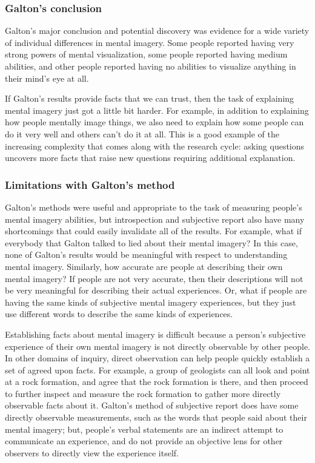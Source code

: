 \documentclass[
  oneside,
  12pt]{crumpbook}
\begin{document}
\hypertarget{galtons-conclusion}{%
\subsubsection{Galton's conclusion}\label{galtons-conclusion}}

Galton's major conclusion and potential discovery was evidence for a wide variety of individual differences in mental imagery. Some people reported having very strong powers of mental visualization, some people reported having medium abilities, and other people reported having no abilities to visualize anything in their mind's eye at all.

If Galton's results provide facts that we can trust, then the task of explaining mental imagery just got a little bit harder. For example, in addition to explaining how people mentally image things, we also need to explain how some people can do it very well and others can't do it at all. This is a good example of the increasing complexity that comes along with the research cycle: asking questions uncovers more facts that raise new questions requiring additional explanation.

\hypertarget{limitations-with-galtons-method}{%
\subsubsection{Limitations with Galton's method}\label{limitations-with-galtons-method}}

Galton's methods were useful and appropriate to the task of measuring people's mental imagery abilities, but introspection and subjective report also have many shortcomings that could easily invalidate all of the results. For example, what if everybody that Galton talked to lied about their mental imagery? In this case, none of Galton's results would be meaningful with respect to understanding mental imagery. Similarly, how accurate are people at describing their own mental imagery? If people are not very accurate, then their descriptions will not be very meaningful for describing their actual experiences. Or, what if people are having the same kinds of subjective mental imagery experiences, but they just use different words to describe the same kinds of experiences.

Establishing facts about mental imagery is difficult because a person's subjective experience of their own mental imagery is not directly observable by other people. In other domains of inquiry, direct observation can help people quickly establish a set of agreed upon facts. For example, a group of geologists can all look and point at a rock formation, and agree that the rock formation is there, and then proceed to further inspect and measure the rock formation to gather more directly observable facts about it. Galton's method of subjective report does have some directly observable measurements, such as the words that people said about their mental imagery; but, people's verbal statements are an indirect attempt to communicate an experience, and do not provide an objective lens for other observers to directly view the experience itself.
\end{document}
